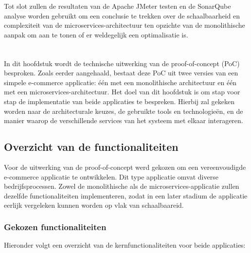 Tot slot zullen de resultaten van de Apache JMeter testen en de SonarQube analyse worden gebruikt om een conclusie te trekken over de schaalbaarheid en complexiteit van de microservices-architectuur ten opzichte van de monolithische aanpak om aan te tonen of er weldegelijk een optimalisatie is.




\chapter{}%
\label{ch:uitwerking}

In dit hoofdstuk wordt de technische uitwerking van de proof-of-concept (PoC) besproken. Zoals eerder aangehaald, bestaat deze PoC uit twee versies van een simpele e-commerce applicatie: één met een monolithische architectuur en één met een microservices-architectuur. Het doel van dit hoofdstuk is om stap voor stap de implementatie van beide applicaties te bespreken. Hierbij zal gekeken worden naar de architecturale keuzes, de gebruikte tools en technologieën, en de manier waarop de verschillende services van het systeem met elkaar interageren.

\section{Overzicht van de functionaliteiten}

Voor de uitwerking van de proof-of-concept werd gekozen om een vereenvoudigde e-commerce applicatie te ontwikkelen. Dit type applicatie omvat diverse bedrijfsprocessen. Zowel de monolithische als de microservices-applicatie zullen dezelfde functionaliteiten implementeren, zodat in een later stadium de applicatie eerlijk vergeleken kunnen worden op vlak van schaalbaareid.

\subsection{Gekozen functionaliteiten}

Hieronder volgt een overzicht van de kernfunctionaliteiten voor beide applicaties:

